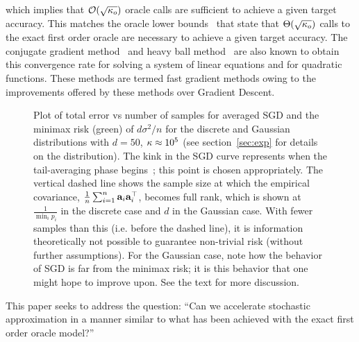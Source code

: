\vspace{-0.2cm}
\noindent which implies that $\mathcal{O}(\sqrt{{\kappa}_o})$ oracle calls are sufficient to achieve a given target accuracy. This matches the oracle lower bounds~\citep{Nesterov04} that state that $\Theta(\sqrt{{\kappa}_o})$ calls to the exact first order oracle are necessary to achieve a given target accuracy. The conjugate gradient method~\citep{HestenesS52} and heavy ball method~\citep{Polyak64} are also known to obtain this convergence rate for solving a system of linear equations and for quadratic functions. These methods are termed fast gradient methods owing to the improvements offered by these methods over Gradient Descent.
\begin{figure}[t!]
\centering
	\vspace*{-2mm}
	\caption{Plot of total error vs number of samples for averaged
          SGD and the minimax risk (green) of $d\sigma^2/n$ for the discrete and
          Gaussian distributions with $d=50$, ${\kappa}\approx 10^5$ (see section~\ref{sec:exp} for
          details on the distribution). The kink in the SGD curve
          represents when the tail-averaging phase
          begins~\citep{JainKKNS16}; this point is chosen appropriately. The vertical dashed line shows the sample size at which
the empirical covariance, $\frac{1}{n}\sum_{i=1}^n \mathbf{a}_i\mathbf{a}_i^{\top}$,
becomes full rank, which is shown at $\frac{1}{\min_i p_{i}}$ in the
discrete case and $d$ in the Gaussian case. With fewer samples than
this (i.e. before the dashed line), it is information theoretically not possible to guarantee
non-trivial risk (without further assumptions). For the Gaussian case,
note how the behavior of SGD is far from the minimax risk; it is this
behavior that one might hope to improve upon.  See the text for more discussion.
}  \vspace*{-.7cm}
\label{fig:exp} 
\end{figure}
This paper seeks to address the question: ``Can we  accelerate
stochastic approximation in a manner similar to what has been achieved
with the exact first order oracle model?''
